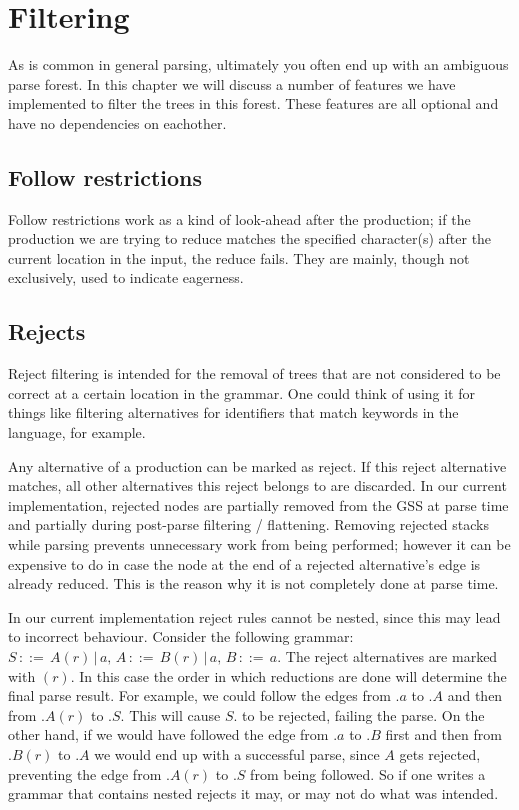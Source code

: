 \documentclass[a4paper,10pt]{article}
\begin{document}
\section{Filtering}
\label{sec:filtering}

As is common in general parsing, ultimately you often end up with an ambiguous parse forest. In this chapter we will discuss a number of features we have implemented to filter the trees in this forest. These features are all optional and have no dependencies on eachother.

\subsection{Follow restrictions}

Follow restrictions work as a kind of look-ahead after the production; if the production we are trying to reduce matches the specified character(s) after the current location in the input, the reduce fails. They are mainly, though not exclusively, used to indicate eagerness.

\subsection{Rejects}

Reject filtering is intended for the removal of trees that are not considered to be correct at a certain location in the grammar. One could think of using it for things like filtering alternatives for identifiers that match keywords in the language, for example.

Any alternative of a production can be marked as reject. If this reject alternative matches, all other alternatives this reject belongs to are discarded. In our current implementation, rejected nodes are partially removed from the GSS at parse time and partially during post-parse filtering / flattening. Removing rejected stacks while parsing prevents unnecessary work from being performed; however it can be expensive to do in case the node at the end of a rejected alternative's edge is already reduced. This is the reason why it is not completely done at parse time.

In our current implementation reject rules cannot be nested, since this may lead to incorrect behaviour. Consider the following grammar: $S\,::=\,A(r)\,|\,a,\,A\,::=\,B(r)\,|\,a,\,B\,::=\,a$. The reject alternatives are marked with $(r)$. In this case the order in which reductions are done will determine the final parse result. For example, we could follow the edges from $.a$ to $.A$ and then from $.A(r)$ to $.S$. This will cause $S.$ to be rejected, failing the parse. On the other hand, if we would have followed the edge from $.a$ to $.B$ first and then from $.B(r)$ to $.A$ we would end up with a successful parse, since $A$ gets rejected, preventing the edge from $.A(r)$ to $.S$ from being followed. So if one writes a grammar that contains nested rejects it may, or may not do what was intended.
\end{document}
